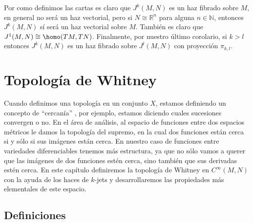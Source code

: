 \documentclass{report}
\theoremstyle{definition}
\let\hom\homo
\DeclareMathOperator{\hom}{Hom}
\begin{document}
Por como definimos las cartas es claro que $J^k( M,N)$ es un haz fibrado sobre $M$, en general no ser\'a un haz vectorial, pero si $N \cong \mathbb{R}^n$ para alguna $n \in \mathbb{N}$, entonces $J^k(M,N)$ s\'i ser\'a un haz vectorial sobre $M$. Tambi\'en es claro que $J^1 (M, N) \cong \hom (TM,TN)$. Finalmente, por nuestro \'ultimo corolario, si $k >l $ entonces $J^k (M,N)$ es un haz fibrado sobre $J^l (M,N)$ con proyecci\'on $\pi_{k, l}$.

\chapter{Topolog\'ia de Whitney}

Cuando definimos una topolog\'ia en un conjunto $X$, estamos definiendo un concepto de ``cercan\'ia'' , por ejemplo, estamos diciendo cuales sucesiones convergen o no. En el \'area de an\'alisis, al espacio de funciones entre dos espacios m\'etricos le damos la topolog\'ia del supremo, en la cual dos funciones est\'an cerca si y s\'olo si sus im\'agenes est\'an cerca. En nuestro caso de funciones entre variedades diferenciables tenemos m\'as estructura, ya que no s\'olo vamos a querer que las im\'agenes de dos funciones est\'en cerca, sino tambi\'en que sus derivadas est\'en cerca. En este cap\'itulo definiremos la topolog\'ia de Whitney en $C^\infty (M,N)$ con la ayuda de los haces de $k$-jets y desarrollaremos las propiedades m\'as elementales de este espacio.
\section{Definiciones}
\end{document}
